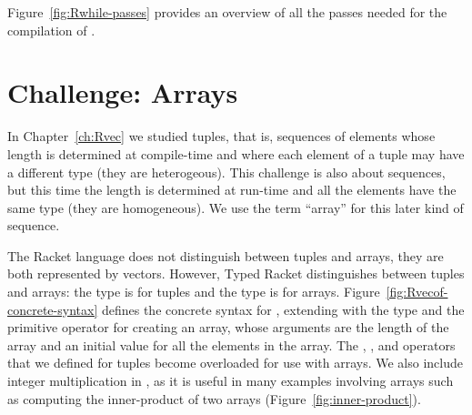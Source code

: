 \documentclass[11pt]{book}
\begin{document}
Figure~\ref{fig:Rwhile-passes} provides an overview of all the passes needed
for the compilation of \LangLoop{}.


\section{Challenge: Arrays}
\label{sec:arrays}

In Chapter~\ref{ch:Rvec} we studied tuples, that is, sequences of
elements whose length is determined at compile-time and where each
element of a tuple may have a different type (they are
heterogeous). This challenge is also about sequences, but this time
the length is determined at run-time and all the elements have the same
type (they are homogeneous). We use the term ``array'' for this later
kind of sequence.

The Racket language does not distinguish between tuples and arrays,
they are both represented by vectors. However, Typed Racket
distinguishes between tuples and arrays: the  type is for
tuples and the  type is for arrays.
%
Figure~\ref{fig:Rvecof-concrete-syntax} defines the concrete syntax
for \LangArray{}, extending \LangLoop{} with the  type
and the  primitive operator for creating an array,
whose arguments are the length of the array and an initial value for
all the elements in the array. The ,
, and  operators that we defined
for tuples become overloaded for use with arrays.
%
We also include integer multiplication in \LangArray{}, as it is
useful in many examples involving arrays such as computing the
inner-product of two arrays (Figure~\ref{fig:inner-product}).
\end{document}
